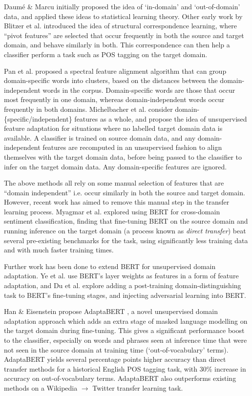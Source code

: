 Daumé \& Marcu \cite{daume} initially proposed the idea of `in-domain' and `out-of-domain' data, and applied these ideas to statistical learning theory. Other early work by Blitzer et al. \cite{scl} introduced the idea of structural correspondence learning, where ``pivot features'' are selected that occur frequently in both the source and target domain, and behave similarly in both. This correspondence can then help a classifier perform a task such as POS tagging on the target domain.

Pan et al. \cite{pan-sfa} proposed a spectral feature alignment algorithm that can group domain-specific words into clusters, based on the distances between the domain-independent words in the corpus. Domain-specific words are those that occur most frequently in one domain, whereas domain-independent words occur frequently in both domains. Michelbacher et al. \cite{feature-adaptation} consider domain-\{specific/independent\} features as a whole, and propose the idea of unsupervised feature adaptation for situations where no labelled target domain data is available. A classifier is trained on source domain data, and any domain-independent features are recomputed in an unsupervised fashion to align themselves with the target domain data, before being passed to the classifier to infer on the target domain data. Any domain-specific features are ignored.

The above methods all rely on some manual selection of features that are ``domain independent'' i.e. occur similarly in both the source and target domain. However, recent work has aimed to remove this manual step in the transfer learning process. Myagmar et al. \cite{cdsc} explored using BERT for cross-domain sentiment classification, finding that fine-tuning BERT on the source domain and running inference on the target domain (a process known as \textit{direct transfer}) beat several pre-existing benchmarks for the task, using significantly less training data and with much faster training times.

Further work has been done to extend BERT for unsupervised domain adaptation. Ye et al. \cite{bert-feature-adaptation} use BERT's layer weights as features in a form of feature adaptation, and Du et al. \cite{domain-aware-bert} explore adding a post-training domain-distinguishing task to BERT's fine-tuning stages, and injecting adversarial learning into BERT.

Han \& Eisenstein propose AdaptaBERT \cite{adaptabert}, a novel unsupervised domain adaptation approach which adds an extra stage of masked language modelling on the target domain during fine-tuning. This gives a significant performance boost to the classifier, especially on words and phrases seen at inference time that were not seen in the source domain at training time (`out-of-vocabulary' terms). AdaptaBERT yields several percentage points higher accuracy than direct transfer methods for a historical English POS tagging task, with 30\% increase in accuracy on out-of-vocabulary terms. AdaptaBERT also outperforms existing methods on a Wikipedia $ \rightarrow $ Twitter transfer learning task.

